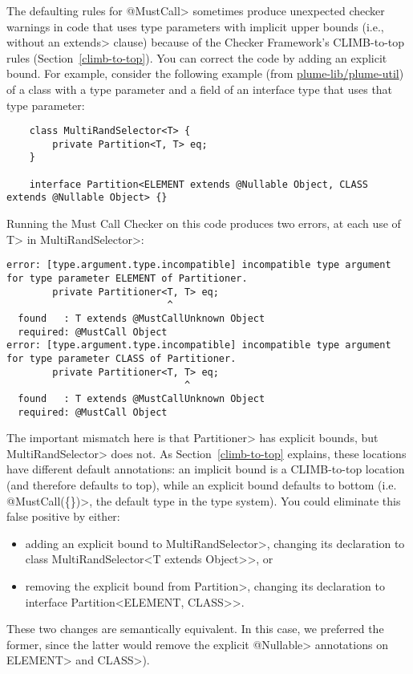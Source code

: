 
The defaulting rules for \<@MustCall> sometimes produce unexpected checker
warnings in code that uses type parameters with implicit upper bounds
(i.e., without an \<extends> clause) because of the Checker Framework's
CLIMB-to-top rules (Section~\ref{climb-to-top}).  You can correct the code
by adding an explicit bound. For example, consider the following
example (from
\href{https://github.com/plume-lib/plume-util}{plume-lib/plume-util}) of a
class with a type parameter and a field of an interface type that uses that
type parameter:
\begin{Verbatim}
    class MultiRandSelector<T> {
        private Partition<T, T> eq;
    }

    interface Partition<ELEMENT extends @Nullable Object, CLASS extends @Nullable Object> {}
\end{Verbatim}

Running the Must Call Checker on this code produces two errors, at each use
of \<T> in \<MultiRandSelector>:

\begin{smaller}
\begin{Verbatim}
error: [type.argument.type.incompatible] incompatible type argument for type parameter ELEMENT of Partitioner.
        private Partitioner<T, T> eq;
                            ^
  found   : T extends @MustCallUnknown Object
  required: @MustCall Object
error: [type.argument.type.incompatible] incompatible type argument for type parameter CLASS of Partitioner.
        private Partitioner<T, T> eq;
                               ^
  found   : T extends @MustCallUnknown Object
  required: @MustCall Object
\end{Verbatim}
\end{smaller}

The important mismatch here is that \<Partitioner> has explicit bounds, but \<MultiRandSelector>
does not. As Section~\ref{climb-to-top} explains, these locations have different default annotations:
an implicit bound is a CLIMB-to-top location (and therefore defaults to top), while an explicit bound
defaults to bottom (i.e. \<@MustCall(\{\})>, the default type in the type system).
You could eliminate this false positive by either:
\begin{itemize}
\item adding an explicit bound to \<MultiRandSelector>, changing its declaration to \<class MultiRandSelector<T extends Object>>, or
\item removing the explicit bound from \<Partition>, changing its declaration to \<interface Partition<ELEMENT, CLASS>>.
\end{itemize}

These two changes are semantically equivalent.  In this case, we preferred
the former, since the latter would remove the explicit \<@Nullable>
annotations on \<ELEMENT> and \<CLASS>).
